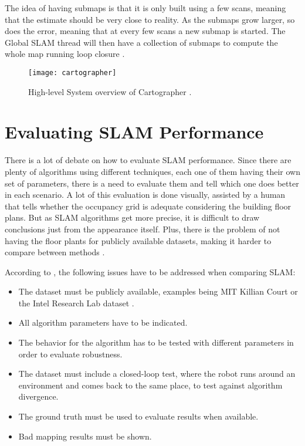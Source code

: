 The idea of having submaps is that it is only built using a few scans, meaning that the estimate should be very close to reality. As the submaps grow larger, so does the error, meaning that at every few scans a new submap is started. The Global SLAM thread will then have a collection of submaps to compute the whole map running loop closure \cite{cartographer2016google}.

\begin{figure}[!ht]
    \centering
    \texttt{[image: cartographer]}
    \caption{High-level System overview of Cartographer \cite{cartographerimage}.}
    \label{fig:cartographer}
\end{figure}

\section{Evaluating SLAM Performance} \label{sec:evaluating}

There is a lot of debate on how to evaluate SLAM performance. Since there are plenty of algorithms using different techniques, each one of them having their own set of parameters, there is a need to evaluate them and tell which one does better in each scenario. A lot of this evaluation is done visually, assisted by a human that tells whether the occupancy grid is adequate considering the building floor plans. But as SLAM algorithms get more precise, it is difficult to draw conclusions just from the appearance itself. Plus, there is the problem of not having the floor plants for publicly available datasets, making it harder to compare between methods \cite{kummerle2009measuring}.

According to \citeauthor{amigoni2007good}, the following issues have to be addressed when comparing SLAM:

\begin{itemize}
    \item The dataset must be publicly available, examples being MIT Killian Court or the Intel Research Lab dataset \cite{kummerle2009measuring}.
    \item All algorithm parameters have to be indicated.
    \item The behavior for the algorithm has to be tested with different parameters in order to evaluate robustness.
    \item The dataset must include a closed-loop test, where the robot runs around an environment and comes back to the same place, to test against algorithm divergence.
    \item The ground truth must be used to evaluate results when available.
    \item Bad mapping results must be shown.
\end{itemize}

